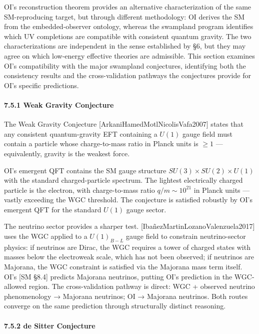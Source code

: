 \documentclass[
]{article}
\begin{document}
OI's reconstruction theorem provides an alternative characterization of
the same SM-reproducing target, but through different methodology: OI
derives the SM from the embedded-observer ontology, whereas the
swampland program identifies which UV completions are compatible with
consistent quantum gravity. The two characterizations are independent in
the sense established by §6, but they may agree on which low-energy
effective theories are admissible. This section examines OI's
compatibility with the major swampland conjectures, identifying both the
consistency results and the cross-validation pathways the conjectures
provide for OI's specific predictions.

\hypertarget{weak-gravity-conjecture}{%
\paragraph{7.5.1 Weak Gravity
Conjecture}\label{weak-gravity-conjecture}}

The Weak Gravity Conjecture {[}ArkaniHamedMotlNicolisVafa2007{]} states
that any consistent quantum-gravity EFT containing a \(U(1)\) gauge
field must contain a particle whose charge-to-mass ratio in Planck units
is \(\geq 1\) --- equivalently, gravity is the weakest force.

OI's emergent QFT contains the SM gauge structure
\(SU(3) \times SU(2) \times U(1)\) with the standard charged-particle
spectrum. The lightest electrically charged particle is the electron,
with charge-to-mass ratio \(q/m \sim 10^{21}\) in Planck units ---
vastly exceeding the WGC threshold. The conjecture is satisfied robustly
by OI's emergent QFT for the standard \(U(1)\) gauge sector.

The neutrino sector provides a sharper test.
{[}IbañezMartinLozanoValenzuela2017{]} uses the WGC applied to a
\(U(1)_{B-L}\) gauge field to constrain neutrino-sector physics: if
neutrinos are Dirac, the WGC requires a tower of charged states with
masses below the electroweak scale, which has not been observed; if
neutrinos are Majorana, the WGC constraint is satisfied via the Majorana
mass term itself. OI's {[}SM §8.4{]} predicts Majorana neutrinos,
putting OI's prediction in the WGC-allowed region. The cross-validation
pathway is direct: WGC + observed neutrino phenomenology → Majorana
neutrinos; OI → Majorana neutrinos. Both routes converge on the same
prediction through structurally distinct reasoning.

\hypertarget{de-sitter-conjecture}{%
\paragraph{7.5.2 de Sitter Conjecture}\label{de-sitter-conjecture}}
\end{document}
